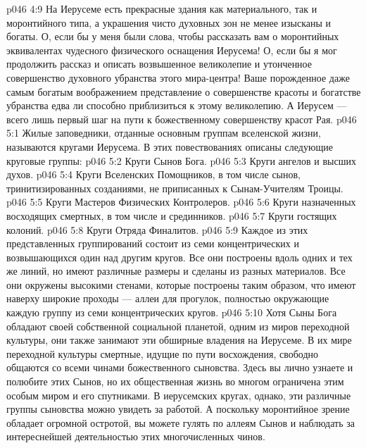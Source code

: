 \vs p046 4:9 На Иерусеме есть прекрасные здания как материального, так и моронтийного типа, а украшения чисто духовных зон не менее изысканы и богаты. О, если бы у меня были слова, чтобы рассказать вам о моронтийных эквивалентах чудесного физического оснащения Иерусема! О, если бы я мог продолжить рассказ и описать возвышенное великолепие и утонченное совершенство духовного убранства этого мира\hyp{}центра! Ваше порожденное даже самым богатым воображением представление о совершенстве красоты и богатстве убранства едва ли способно приблизиться к этому великолепию. А Иерусем --- всего лишь первый шаг на пути к божественному совершенству красот Рая.
\vs p046 5:1 Жилые заповедники, отданные основным группам вселенской жизни, называются кругами Иерусема. В этих повествованиях описаны следующие круговые группы:
\vs p046 5:2 \bibnobreakspace Круги Сынов Бога.
\vs p046 5:3 \bibnobreakspace Круги ангелов и высших духов.
\vs p046 5:4 \bibnobreakspace Круги Вселенских Помощников, в том числе сынов, тринитизированных созданиями, не приписанных к Сынам\hyp{}Учителям Троицы.
\vs p046 5:5 \bibnobreakspace Круги Мастеров Физических Контролеров.
\vs p046 5:6 \bibnobreakspace Круги назначенных восходящих смертных, в том числе и срединников.
\vs p046 5:7 \bibnobreakspace Круги гостящих колоний.
\vs p046 5:8 \bibnobreakspace Круги Отряда Финалитов.
\vs p046 5:9 \pc Каждое из этих представленных группирований состоит из семи концентрических и возвышающихся один над другим кругов. Все они построены вдоль одних и тех же линий, но имеют различные размеры и сделаны из разных материалов. Все они окружены высокими стенами, которые построены таким образом, что имеют наверху широкие проходы --- аллеи для прогулок, полностью окружающие каждую группу из семи концентрических кругов.
\vs p046 5:10 \bibnobreakspace {} Хотя Сыны Бога обладают своей собственной социальной планетой, одним из миров переходной культуры, они также занимают эти обширные владения на Иерусеме. В их мире переходной культуры смертные, идущие по пути восхождения, свободно общаются со всеми чинами божественного сыновства. Здесь вы лично узнаете и полюбите этих Сынов, но их общественная жизнь во многом ограничена этим особым миром и его спутниками. В иерусемских кругах, однако, эти различные группы сыновства можно увидеть за работой. А поскольку моронтийное зрение обладает огромной остротой, вы можете гулять по аллеям Сынов и наблюдать за интереснейшей деятельностью этих многочисленных чинов.
